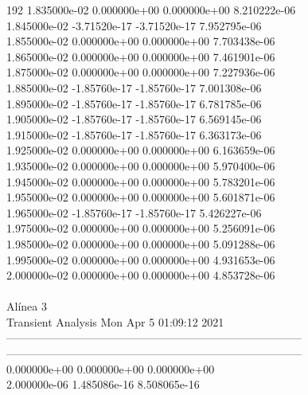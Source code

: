 192	1.835000e-02	0.000000e+00	0.000000e+00	8.210222e-06	\\ 	1.845000e-02	-3.71520e-17	-3.71520e-17	7.952795e-06	\\ 	1.855000e-02	0.000000e+00	0.000000e+00	7.703438e-06	\\ 	1.865000e-02	0.000000e+00	0.000000e+00	7.461901e-06	\\ 	1.875000e-02	0.000000e+00	0.000000e+00	7.227936e-06	\\ 	1.885000e-02	-1.85760e-17	-1.85760e-17	7.001308e-06	\\ 	1.895000e-02	-1.85760e-17	-1.85760e-17	6.781785e-06	\\ 	1.905000e-02	-1.85760e-17	-1.85760e-17	6.569145e-06	\\ 	1.915000e-02	-1.85760e-17	-1.85760e-17	6.363173e-06	\\ 	1.925000e-02	0.000000e+00	0.000000e+00	6.163659e-06	\\ 	1.935000e-02	0.000000e+00	0.000000e+00	5.970400e-06	\\ 	1.945000e-02	0.000000e+00	0.000000e+00	5.783201e-06	\\ 	1.955000e-02	0.000000e+00	0.000000e+00	5.601871e-06	\\ 	1.965000e-02	-1.85760e-17	-1.85760e-17	5.426227e-06	\\ 	1.975000e-02	0.000000e+00	0.000000e+00	5.256091e-06	\\ 	1.985000e-02	0.000000e+00	0.000000e+00	5.091288e-06	\\ 	1.995000e-02	0.000000e+00	0.000000e+00	4.931653e-06	\\ 	2.000000e-02	0.000000e+00	0.000000e+00	4.853728e-06	\\ \hline
\\ \hline
                                   Alínea 3 \\ \hline
                                   Transient Analysis  Mon Apr  5 01:09:12  2021\\ \hline
--------------------------------------------------------------------------------\\ \hline
--------------------------------------------------------------------------------\\ 	0.000000e+00	0.000000e+00	0.000000e+00	\\ 	2.000000e-06	1.485086e-16	8.508065e-16	\\ \hline
